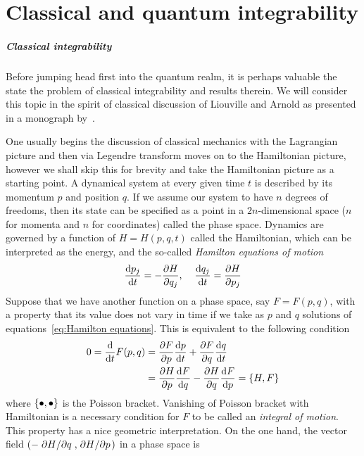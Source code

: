 \chapter{Classical and quantum integrability\label{app:int}}
\thispagestyle{chapterBeginStyle}

\paragraph{Classical integrability}Before jumping head first into the quantum realm, it is perhaps valuable the state
the problem of classical integrability and results therein.
We will consider this topic in the spirit of classical discussion
of Liouville and Arnold as presented in a monograph by~\textcite{Gutzwiller1991}.

One usually begins the discussion of classical mechanics with the Lagrangian picture and then
via Legendre transform moves on to the Hamiltonian picture, however we shall skip this
for brevity and take the Hamiltonian picture as a starting point.
A dynamical system at every given time \(t\) is described by its momentum \(p\) and
position \(q\). If we assume our system to have \(n\) degrees of freedoms, then
its state can be specified as a point in a \(2n\)-dimensional space (\(n\) for momenta and
\(n\) for coordinates) called the phase space. Dynamics are governed by a function
of \(H = H(p,q,t)\) called the Hamiltonian, which can be interpreted as the energy,
and the so-called \textit{Hamilton equations of motion}
\begin{equation}
    \dv{p_j}{t} = -\pdv{H}{q_j},\;\;\;\; \dv{q_j}{t} = \pdv{H}{p_j}
    \label{eq:Hamilton equations}
\end{equation} 
Suppose that we have another function on a phase space, say \(F=F(p,q)\), with
a property that its value does not vary in time if we take as \(p\) and \(q\) solutions
of equations~\eqref{eq:Hamilton equations}. This is equivalent to the following condition
\begin{align}
    0 = \dv{}{t}F(p,q) &= \pdv{F}{p} \dv{p}{t} + \pdv{F}{q}\dv{q}{t} \nonumber\\
    &= \pdv{H}{p}\dv{F}{q} - \pdv{H}{q}\dv{F}{p} = \poissonbracket{H}{F}
\end{align}
where \(\poissonbracket{\bullet }{\bullet }\) is the Poisson bracket.
Vanishing of Poisson bracket with Hamiltonian is a necessary condition for \(F\)
to be called an \textit{integral of motion}. This property has a nice geometric interpretation.
On the one hand, the vector field \(\left(-\pdv*{H}{q},\pdv*{H}{p}\right)\) in a phase space is
